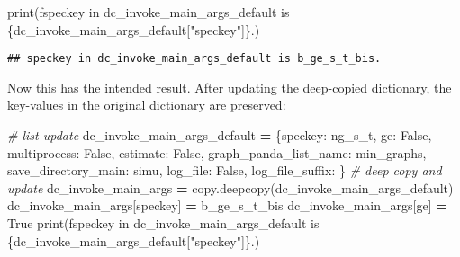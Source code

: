 \documentclass[
]{book}
\newenvironment{Shaded}{\begin{snugshade}}{\end{snugshade}}
\newcommand{\BuiltInTok}[1]{#1}
\newcommand{\CommentTok}[1]{\textcolor[rgb]{0.56,0.35,0.01}{\textit{#1}}}
\newcommand{\NormalTok}[1]{#1}
\newcommand{\OperatorTok}[1]{\textcolor[rgb]{0.81,0.36,0.00}{\textbf{#1}}}
\newcommand{\SpecialCharTok}[1]{\textcolor[rgb]{0.00,0.00,0.00}{#1}}
\newcommand{\SpecialStringTok}[1]{\textcolor[rgb]{0.31,0.60,0.02}{#1}}
\newcommand{\StringTok}[1]{\textcolor[rgb]{0.31,0.60,0.02}{#1}}
\newcommand{\VariableTok}[1]{\textcolor[rgb]{0.00,0.00,0.00}{#1}}
\begin{document}
\begin{Shaded}
\begin{Highlighting}[]
\BuiltInTok{print}\NormalTok{(}\SpecialStringTok{f\textquotesingle{}speckey in dc\_invoke\_main\_args\_default is }\SpecialCharTok{\{}\NormalTok{dc\_invoke\_main\_args\_default[}\StringTok{"speckey"}\NormalTok{]}\SpecialCharTok{\}}\SpecialStringTok{.\textquotesingle{}}\NormalTok{)}
\end{Highlighting}
\end{Shaded}

\begin{verbatim}
## speckey in dc_invoke_main_args_default is b_ge_s_t_bis.
\end{verbatim}

Now this has the intended result. After updating the deep-copied dictionary, the key-values in the original dictionary are preserved:

\begin{Shaded}
\begin{Highlighting}[]
\CommentTok{\# list update}
\NormalTok{dc\_invoke\_main\_args\_default }\OperatorTok{=}\NormalTok{ \{}\StringTok{\textquotesingle{}speckey\textquotesingle{}}\NormalTok{: }\StringTok{\textquotesingle{}ng\_s\_t\textquotesingle{}}\NormalTok{,}
                               \StringTok{\textquotesingle{}ge\textquotesingle{}}\NormalTok{: }\VariableTok{False}\NormalTok{,}
                               \StringTok{\textquotesingle{}multiprocess\textquotesingle{}}\NormalTok{: }\VariableTok{False}\NormalTok{,}
                               \StringTok{\textquotesingle{}estimate\textquotesingle{}}\NormalTok{: }\VariableTok{False}\NormalTok{,}
                               \StringTok{\textquotesingle{}graph\_panda\_list\_name\textquotesingle{}}\NormalTok{: }\StringTok{\textquotesingle{}min\_graphs\textquotesingle{}}\NormalTok{,}
                               \StringTok{\textquotesingle{}save\_directory\_main\textquotesingle{}}\NormalTok{: }\StringTok{\textquotesingle{}simu\textquotesingle{}}\NormalTok{,}
                               \StringTok{\textquotesingle{}log\_file\textquotesingle{}}\NormalTok{: }\VariableTok{False}\NormalTok{,}
                               \StringTok{\textquotesingle{}log\_file\_suffix\textquotesingle{}}\NormalTok{: }\StringTok{\textquotesingle{}\textquotesingle{}}\NormalTok{\}}
\CommentTok{\# deep copy and update}
\NormalTok{dc\_invoke\_main\_args }\OperatorTok{=}\NormalTok{ copy.deepcopy(dc\_invoke\_main\_args\_default)}
\NormalTok{dc\_invoke\_main\_args[}\StringTok{\textquotesingle{}speckey\textquotesingle{}}\NormalTok{] }\OperatorTok{=} \StringTok{\textquotesingle{}b\_ge\_s\_t\_bis\textquotesingle{}}
\NormalTok{dc\_invoke\_main\_args[}\StringTok{\textquotesingle{}ge\textquotesingle{}}\NormalTok{] }\OperatorTok{=} \VariableTok{True}
\BuiltInTok{print}\NormalTok{(}\SpecialStringTok{f\textquotesingle{}speckey in dc\_invoke\_main\_args\_default is }\SpecialCharTok{\{}\NormalTok{dc\_invoke\_main\_args\_default[}\StringTok{"speckey"}\NormalTok{]}\SpecialCharTok{\}}\SpecialStringTok{.\textquotesingle{}}\NormalTok{)}
\end{Highlighting}
\end{Shaded}
\end{document}
